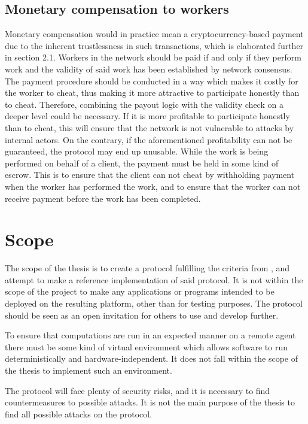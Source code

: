\subsection{Monetary compensation to workers}
\label{sec:prob:compensation}
Monetary compensation would in practice mean a cryptocurrency-based payment due to the inherent trustlessness in such transactions, which is elaborated further in section 2.1. Workers in the network should be paid if and only if they perform work and the validity of said work has been established by network consensus. The payment procedure should be conducted in a way which makes it costly for the worker to cheat, thus making it more attractive to participate honestly than to cheat. Therefore, combining the payout logic with the validity check on a deeper level could be necessary. If it is more profitable to participate honestly than to cheat, this will ensure that the network is not vulnerable to attacks by internal actors. On the contrary, if the aforementioned profitability can not be guaranteed, the protocol may end up unusable. While the work is being performed on behalf of a client, the payment must be held in some kind of escrow. This is to ensure that the client can not cheat by withholding payment when the worker has performed the work, and to ensure that the worker can not receive payment before the work has been completed.

\section{Scope}
The scope of the thesis is to create a protocol fulfilling the criteria from , and attempt to make a reference implementation of said protocol. It is not within the scope of the project to make any applications or programs intended to be deployed on the resulting platform, other than for testing purposes. The protocol should be seen as an open invitation for others to use and develop further.

To ensure that computations are run in an expected manner on a remote agent there must be some kind of virtual environment which allows software to run deterministically and hardware-independent. It does not fall within the scope of the thesis to implement such an environment.

The protocol will face plenty of security risks, and it is necessary to find countermeasures to possible attacks. It is not the main purpose of the thesis to find all possible attacks on the protocol.
